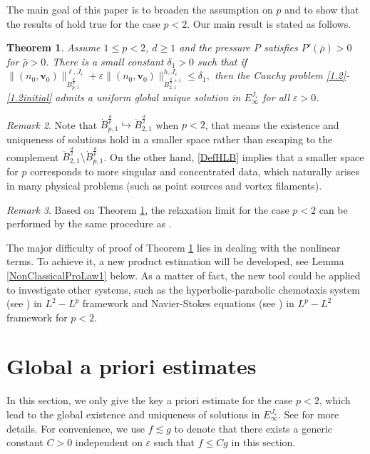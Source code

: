 \documentclass{amsart}
\newtheorem{theorem}{Theorem}[section]
\theoremstyle{definition}
\theoremstyle{remark}
\newtheorem{remark}[theorem]{Remark}
\numberwithin{equation}{section}
\def\dB{{\dot {B}}}
\def\bv{{\bm{v} }}
\begin{document}
The main goal of this paper is to broaden the assumption on $p$ and to show that the results of \cite{BaratDanchin,BaratDanchin2,XuZhang} hold true for the case $p<2$. Our main result is stated as follows.
\begin{theorem}\label{thm}
Assume $1\leq p <2$, $d\geq 1$ and the pressure $P$ satisfies $P'(\bar{\rho})>0$ for $\bar{\rho}>0$. There is a small constant $\delta_1>0$ such that if
$
\|(n_0,\bv_0)\|_{\dB_{p,1}^{\frac{d}{p}}}^{\ell,J_\varepsilon}
+\varepsilon\|(n_0,\bv_0)\|_{\dB_{2,1}^{\frac{d}{2}+1}}^{h,J_\varepsilon}
\leq \delta_1,
$
then the Cauchy problem \eqref{1.2}-\eqref{1.2initial} admits a uniform global unique solution in $E_\infty^{J_\varepsilon}$ for all $\varepsilon>0$.
\end{theorem}
\begin{remark}
Note that $\dot{B}_{p,1}^{\frac{d}{p}}\hookrightarrow \dot{B}_{2,1}^{\frac{d}{2}}$ when $p<2$, that means the existence and uniqueness of solutions hold in a smaller space rather than escaping to the complement $\dot{B}_{2,1}^{\frac{d}{2}}\setminus \dot{B}_{p,1}^{\frac{d}{p}}$. On the other hand, \eqref{DefHLB} implies that a smaller space for $p$ corresponds to more singular and concentrated data, which naturally arises in many physical problems (such as point sources and vortex filaments).
\end{remark}

\begin{remark}
Based on Theorem \ref{thm}, the relaxation limit for the case $p<2$ can be performed by the same procedure as \cite{BaratDanchin2}.
\end{remark}

The major difficulty of proof of Theorem \ref{thm} lies in dealing with the nonlinear terms. To achieve it, a new product estimation will be developed, see Lemma \ref{NonClassicalProLaw1} below. As a matter of fact, the new tool could be applied to investigate other systems, such as the hyperbolic-parabolic chemotaxis system (see \cite{BaratShou2}) in $L^2-L^p$ framework and Navier-Stokes equations (see \cite{Danchin} ) in $L^p-L^2$ framework for $p<2$.

\section{Global a priori estimates}
In this section, we only give the key a priori estimate for the case $p<2$, which lead to the global existence and uniqueness of solutions in $E_\infty^{J_\varepsilon}$. See \cite{BShouZhang} for more details. For convenience, we use $ f\lesssim g $ to denote that there exists a generic constant $C>0$ independent on $\varepsilon$ such that $f\leq C g$ in this section.
\end{document}
